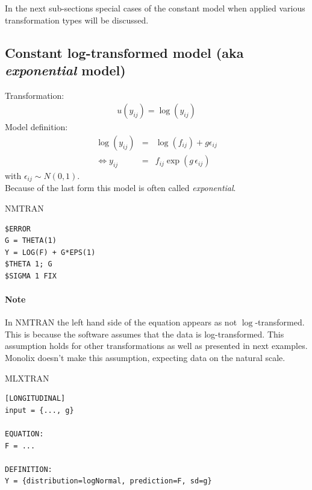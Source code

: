 \bigskip
In the next sub-sections special cases of the constant model when applied various 
transformation types will be discussed.
\subsection{Constant log-transformed model (aka \emph{exponential} model)}
\label{model10}

Transformation:
\begin{eqnarray}
u(y_{ij}) = \log(y_{ij}) \nonumber
\end{eqnarray}
Model definition:
\begin{eqnarray}
 \log(y_{ij}) &=& \log(f_{ij}) + g\epsilon_{ij} \nonumber \\ 
 \Longleftrightarrow  y_{ij} &=& f_{ij} \exp(g\,\epsilon_{ij}) \nonumber
\end{eqnarray}
with $\epsilon_{ij} \sim N(0,1)$.\\
Because of the last form this model is often called \emph{exponential}.


\bigskip
\begin{lrbox}{\lstbox}\begin{minipage}{16cm}
NMTRAN
\begin{lstlisting}[frame=single,language=NM]
$ERROR
G = THETA(1)
Y = LOG(F) + G*EPS(1)
$THETA 1; G
$SIGMA 1 FIX
\end{lstlisting}   
\end{minipage}\end{lrbox}
\usebox\lstbox

\paragraph{Note} \label{noteOnNM} In NMTRAN the left hand \marginpar{\HandCuffLeft} side of the equation 
appears as not $\log$-transformed. This is because the software assumes 
that the data is log-transformed. This assumption holds for other transformations as well 
as presented in next examples. Monolix doesn't make this assumption, 
expecting data on the natural scale.

\bigskip
\begin{lrbox}{\lstbox}\begin{minipage}{16cm}
MLXTRAN
\begin{lstlisting}[frame=single,language=MLX]
[LONGITUDINAL]
input = {..., g}

EQUATION:
F = ...

DEFINITION:
Y = {distribution=logNormal, prediction=F, sd=g}
\end{lstlisting}   
\end{minipage}\end{lrbox}
\usebox\lstbox



